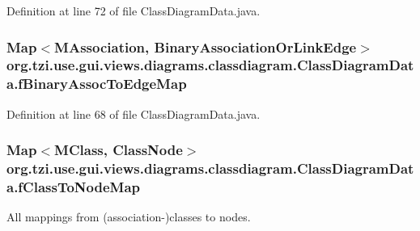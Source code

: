 Definition at line 72 of file Class\-Diagram\-Data.\-java.

\hypertarget{classorg_1_1tzi_1_1use_1_1gui_1_1views_1_1diagrams_1_1classdiagram_1_1_class_diagram_data_a16c3c93ed7afcb1e94c90f8195e04d3e}{
\subsubsection[{f\-Binary\-Assoc\-To\-Edge\-Map}]{\setlength{\rightskip}{0pt plus 5cm}Map$<${\bf M\-Association}, {\bf Binary\-Association\-Or\-Link\-Edge}$>$ org.\-tzi.\-use.\-gui.\-views.\-diagrams.\-classdiagram.\-Class\-Diagram\-Data.\-f\-Binary\-Assoc\-To\-Edge\-Map}}\label{classorg_1_1tzi_1_1use_1_1gui_1_1views_1_1diagrams_1_1classdiagram_1_1_class_diagram_data_a16c3c93ed7afcb1e94c90f8195e04d3e}


Definition at line 68 of file Class\-Diagram\-Data.\-java.

\hypertarget{classorg_1_1tzi_1_1use_1_1gui_1_1views_1_1diagrams_1_1classdiagram_1_1_class_diagram_data_a17685b8172fa58dabe8e36aed437e7af}{
\subsubsection[{f\-Class\-To\-Node\-Map}]{\setlength{\rightskip}{0pt plus 5cm}Map$<${\bf M\-Class}, {\bf Class\-Node}$>$ org.\-tzi.\-use.\-gui.\-views.\-diagrams.\-classdiagram.\-Class\-Diagram\-Data.\-f\-Class\-To\-Node\-Map}}\label{classorg_1_1tzi_1_1use_1_1gui_1_1views_1_1diagrams_1_1classdiagram_1_1_class_diagram_data_a17685b8172fa58dabe8e36aed437e7af}
All mappings from (association-\/)classes to nodes. 


